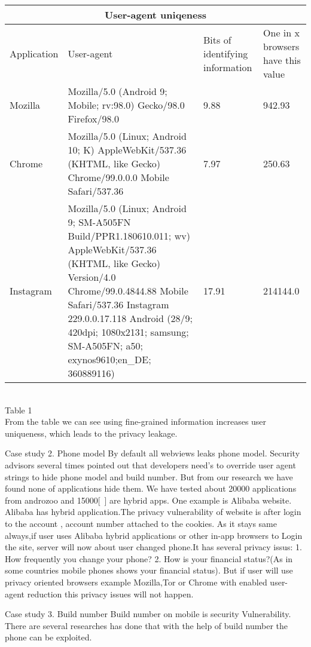 \begin{tabular}{ |p{3cm}||p{3cm}|p{3cm}|p{3cm} |}
 \hline
 \multicolumn{4}{|c|}{User-agent uniqeness} \\
 \hline
Application & User-agent& Bits of identifying information& One in x browsers have this value\\
 \hline
Mozilla & Mozilla/5.0 (Android 9; Mobile; rv:98.0) Gecko/98.0 Firefox/98.0& 9.88 & 942.93\\
 \hline
Chrome & Mozilla/5.0 (Linux; Android 10; K) AppleWebKit/537.36 (KHTML, like Gecko) Chrome/99.0.0.0 Mobile Safari/537.36 & 7.97 & 250.63\\
 \hline
Instagram & Mozilla/5.0 (Linux; Android 9; SM-A505FN Build/PPR1.180610.011; wv) AppleWebKit/537.36 (KHTML, like Gecko) Version/4.0  Chrome/99.0.4844.88 Mobile Safari/537.36 Instagram 229.0.0.17.118  Android (28/9; 420dpi; 1080x2131;           samsung; SM-A505FN; a50; exynos9610;en\_DE; 360889116) &17.91 & 214144.0\\
\hline
\end{tabular}\\
  Table 1 
 \\
From the table we can see using fine-grained information increases user uniqueness, which leads to the privacy leakage.

Case study 2. Phone model 
By default all webviews leaks phone model. Security advisors several times pointed out that developers need's to override user agent strings to hide phone model and build number\cite{forum}\cite{nightwatch}\cite{nightwatch1}. But from our research we have found none of applications hide them. We have tested about 20000 applications from androzoo and 15000[~] are hybrid apps. 
One example is Alibaba website. Alibaba has hybrid application.The privacy vulnerability of website is after login to the account  , account number attached to the cookies. As it stays same always,if user uses Alibaba hybrid applications or other in-app browsers to Login the site, server will now about user changed phone.It has several privacy issus:
1. How frequently you change your phone?
2. How is your financial status?(As in some countries mobile phones shows your financial status).
But if user will use privacy oriented browsers example Mozilla,Tor or Chrome with enabled user-agent reduction this privacy issues will not happen. 

Case study 3. Build number 
Build number on mobile is security Vulnerability. There are several researches has done that with the help of build number the phone can be exploited\cite{nightwatch02}.

